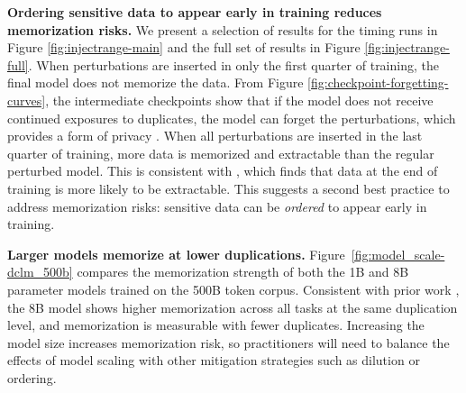 \textbf{Ordering sensitive data to appear early in training reduces memorization risks.} We present a selection of results for the timing runs in Figure \ref{fig:injectrange-main} and the full set of results in Figure \ref{fig:injectrange-full}. When perturbations are inserted in only the first quarter of training, the final model does not memorize the data. From Figure \ref{fig:checkpoint-forgetting-curves}, the intermediate checkpoints show that if the model does not receive continued exposures to duplicates, the model can forget the perturbations, which provides a form of privacy \citep{jagielski2023measuring,chang2024large}. When all perturbations are inserted in the last quarter of training, more data is memorized and extractable than the regular perturbed model. This is consistent with \cite{more2025realisticextractionattacksadversarial}, which finds that data at the end of training is more likely to be extractable. This suggests a second best practice to address memorization risks: sensitive data can be \textit{ordered} to appear early in training. 

\textbf{Larger models memorize at lower duplications.} Figure~\ref{fig:model_scale-dclm_500b} compares the memorization strength of both the 1B and 8B parameter models trained on the 500B token corpus. Consistent with prior work \citep{tirumala2022memorization}, the 8B model shows higher memorization across all tasks at the same duplication level, and memorization is measurable with fewer duplicates. Increasing the model size increases memorization risk, so practitioners will need to balance the effects of model scaling with other mitigation strategies such as dilution or ordering.



